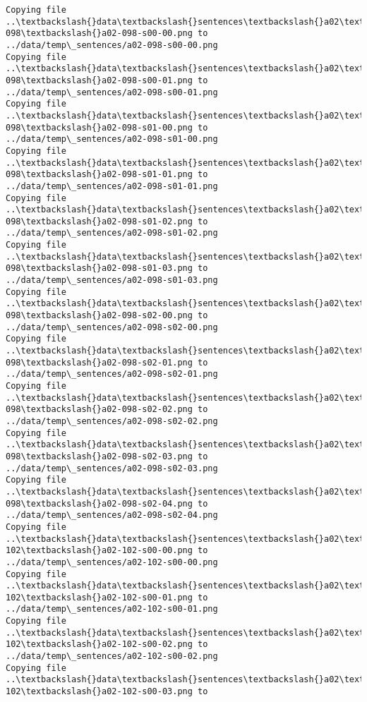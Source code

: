 \documentclass[11pt]{article}
\begin{document}
\begin{Verbatim}[commandchars=\\\{\}]
Copying file ..\textbackslash{}data\textbackslash{}sentences\textbackslash{}a02\textbackslash{}a02-098\textbackslash{}a02-098-s00-00.png to
../data/temp\_sentences/a02-098-s00-00.png
Copying file ..\textbackslash{}data\textbackslash{}sentences\textbackslash{}a02\textbackslash{}a02-098\textbackslash{}a02-098-s00-01.png to
../data/temp\_sentences/a02-098-s00-01.png
Copying file ..\textbackslash{}data\textbackslash{}sentences\textbackslash{}a02\textbackslash{}a02-098\textbackslash{}a02-098-s01-00.png to
../data/temp\_sentences/a02-098-s01-00.png
Copying file ..\textbackslash{}data\textbackslash{}sentences\textbackslash{}a02\textbackslash{}a02-098\textbackslash{}a02-098-s01-01.png to
../data/temp\_sentences/a02-098-s01-01.png
Copying file ..\textbackslash{}data\textbackslash{}sentences\textbackslash{}a02\textbackslash{}a02-098\textbackslash{}a02-098-s01-02.png to
../data/temp\_sentences/a02-098-s01-02.png
Copying file ..\textbackslash{}data\textbackslash{}sentences\textbackslash{}a02\textbackslash{}a02-098\textbackslash{}a02-098-s01-03.png to
../data/temp\_sentences/a02-098-s01-03.png
Copying file ..\textbackslash{}data\textbackslash{}sentences\textbackslash{}a02\textbackslash{}a02-098\textbackslash{}a02-098-s02-00.png to
../data/temp\_sentences/a02-098-s02-00.png
Copying file ..\textbackslash{}data\textbackslash{}sentences\textbackslash{}a02\textbackslash{}a02-098\textbackslash{}a02-098-s02-01.png to
../data/temp\_sentences/a02-098-s02-01.png
Copying file ..\textbackslash{}data\textbackslash{}sentences\textbackslash{}a02\textbackslash{}a02-098\textbackslash{}a02-098-s02-02.png to
../data/temp\_sentences/a02-098-s02-02.png
Copying file ..\textbackslash{}data\textbackslash{}sentences\textbackslash{}a02\textbackslash{}a02-098\textbackslash{}a02-098-s02-03.png to
../data/temp\_sentences/a02-098-s02-03.png
Copying file ..\textbackslash{}data\textbackslash{}sentences\textbackslash{}a02\textbackslash{}a02-098\textbackslash{}a02-098-s02-04.png to
../data/temp\_sentences/a02-098-s02-04.png
Copying file ..\textbackslash{}data\textbackslash{}sentences\textbackslash{}a02\textbackslash{}a02-102\textbackslash{}a02-102-s00-00.png to
../data/temp\_sentences/a02-102-s00-00.png
Copying file ..\textbackslash{}data\textbackslash{}sentences\textbackslash{}a02\textbackslash{}a02-102\textbackslash{}a02-102-s00-01.png to
../data/temp\_sentences/a02-102-s00-01.png
Copying file ..\textbackslash{}data\textbackslash{}sentences\textbackslash{}a02\textbackslash{}a02-102\textbackslash{}a02-102-s00-02.png to
../data/temp\_sentences/a02-102-s00-02.png
Copying file ..\textbackslash{}data\textbackslash{}sentences\textbackslash{}a02\textbackslash{}a02-102\textbackslash{}a02-102-s00-03.png to

\end{Verbatim}
\end{document}
